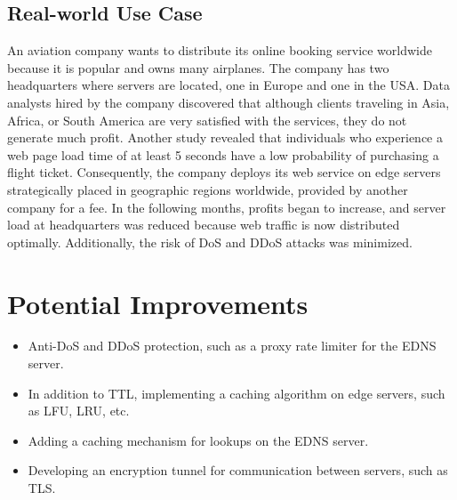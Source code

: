 \documentclass[runningheads]{llncs}
\begin{document}
\subsection{Real-world Use Case}

An aviation company wants to distribute its online booking service worldwide because it is popular and owns many airplanes. The company has two headquarters where servers are located, one in Europe and one in the USA. Data analysts hired by the company discovered that although clients traveling in Asia, Africa, or South America are very satisfied with the services, they do not generate much profit. Another study revealed that individuals who experience a web page load time of at least 5 seconds have a low probability of purchasing a flight ticket. Consequently, the company deploys its web service on edge servers strategically placed in geographic regions worldwide, provided by another company for a fee. In the following months, profits began to increase, and server load at headquarters was reduced because web traffic is now distributed optimally. Additionally, the risk of DoS and DDoS attacks was minimized.

\section{Potential Improvements}

\begin{itemize}
    \item Anti-DoS and DDoS protection, such as a proxy rate limiter for the EDNS server.
    \item In addition to TTL, implementing a caching algorithm on edge servers, such as LFU, LRU, etc.
    \item Adding a caching mechanism for lookups on the EDNS server.
    \item Developing an encryption tunnel for communication between servers, such as TLS.
\end{itemize}
\end{document}
